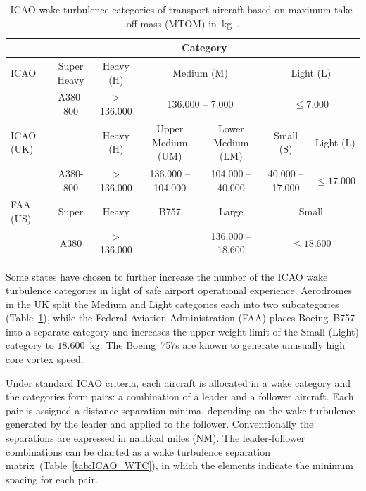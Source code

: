 \begin{table}[ht]
    \centering
    \resizebox{1\textwidth}{!} {
    \begin{tabular}{l|c|c|c|c|c|c}
    ~    & \multicolumn{6}{c}{Category} \\ \hline
    ICAO & Super Heavy & Heavy (H) & \multicolumn{2}{c|}{Medium (M)} & \multicolumn{2}{c}{Light (L)} \\
    
    ~    & A380-800    & > 136.000  & \multicolumn{2}{c|}{ 136.000 -- 7.000 } & \multicolumn{2}{c}{$ \leq 7.000$} \\ \hline
    
    ICAO (UK)   & ~  & Heavy (H) & Upper Medium (UM) & Lower Medium (LM) & Small (S)  & Light (L) \\
    
    ~    & A380-800    & > 136.000  & 136.000 -- 104.000     & 104.000 -- 40.000      & 40.000 -- 17.000 & $ \leq 17.000 $   \\ \hline
    
    FAA (US)   & Super      & Heavy & B757   & Large   & \multicolumn{2}{c}{Small} \\
    
    ~    & A380        &  > 136.000   & ~                 &  136.000 -- 18.600       & \multicolumn{2}{c}{$ \leq 18.600 $} \\ 
    \end{tabular}}
    \caption[ICAO wake turbulence categories based on maximum take-off mass]{ICAO wake turbulence categories of transport aircraft based on maximum take-off mass (MTOM) in~kg~\cite{doc4444full, uk_aeronautical_information_services_wake_2017, kolos2013influence}.} \label{tab:WTC}
\end{table}

Some states have chosen to further increase the number of the ICAO wake turbulence categories in light of safe airport operational experience. Aerodromes in the UK split the Medium and Light categories each into two subcategories (Table~\ref{tab:WTC}), while the Federal Aviation Administration (FAA) places Boeing~B757 into a separate category and increases the upper weight limit of the Small (Light) category to $18.600$~kg. The Boeing~757s are known to generate unusually high core vortex speed.~\cite{icao_wtc, uk_aeronautical_information_services_wake_2017, noauthor_recat_2018}

Under standard ICAO criteria, each aircraft is allocated in a wake category and the categories form pairs: a combination of a leader and a follower aircraft. Each pair is assigned a distance separation minima, depending on the wake turbulence generated by the leader and applied to the follower. Conventionally the separations are expressed in nautical miles (NM). The leader-follower combinations can be charted as a wake turbulence separation matrix~(Table~\ref{tab:ICAO_WTC}), in which the elements indicate the minimum spacing for each pair.

